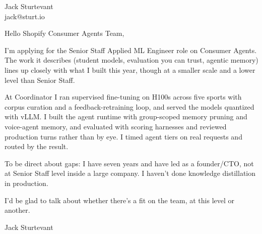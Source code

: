 \documentclass[11pt]{article}
\begin{document}
\raggedright

{\namefont\fontsize{20pt}{24pt}\selectfont Jack Sturtevant}\\[-0.3em]
jack@sturt.io

\vspace{1.2em}

Hello Shopify Consumer Agents Team,

I'm applying for the Senior Staff Applied ML Engineer role on Consumer Agents. The work it describes (student models, evaluation you can trust, agentic memory) lines up closely with what I built this year, though at a smaller scale and a lower level than Senior Staff.

At Coordinator I ran supervised fine-tuning on H100s across five sports with corpus curation and a feedback-retraining loop, and served the models quantized with vLLM. I built the agent runtime with group-scoped memory pruning and voice-agent memory, and evaluated with scoring harnesses and reviewed production turns rather than by eye. I timed agent tiers on real requests and routed by the result.

To be direct about gaps: I have seven years and have led as a founder/CTO, not at Senior Staff level inside a large company. I haven't done knowledge distillation in production.

I'd be glad to talk about whether there's a fit on the team, at this level or another.

\vspace{0.6em}
Jack Sturtevant
\end{document}
